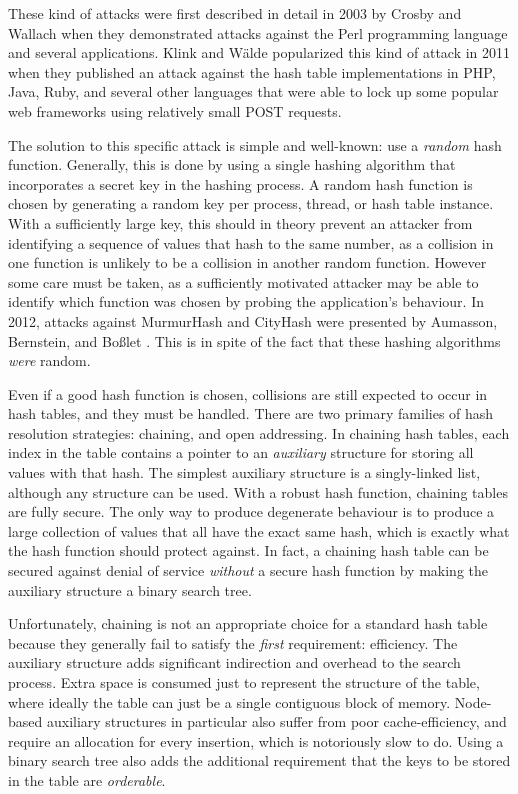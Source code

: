 \documentclass{cccg13}
\begin{document}
These kind of attacks were first described in detail in 2003 by Crosby and
Wallach \cite{perl-dos} when they demonstrated attacks against the Perl
programming language and several applications. Klink and Wälde \cite{web-dos}
popularized this kind of attack in 2011 when they published an attack against
the hash table implementations in PHP, Java, Ruby, and several other languages
that were able to lock up some popular web frameworks using relatively small
POST requests.

The solution to this specific attack is simple and well-known: use a
\emph{random} hash function.  Generally, this is done by using a single
hashing algorithm that incorporates a secret key in the hashing process. A
random hash function is chosen by generating a random key per process, thread,
or hash table instance. With a sufficiently large key, this should in theory
prevent an attacker from identifying a sequence of values that hash to the
same number, as a collision in one function is unlikely to be a collision in
another random function. However some care must be taken, as a sufficiently
motivated attacker may be able to identify which function was chosen by
probing the application's behaviour. In 2012, attacks against MurmurHash and
CityHash were presented by Aumasson, Bernstein, and Boßlet \cite{murmur-dos}.
This is in spite of the fact that these hashing algorithms \emph{were} random.

Even if a good hash function is chosen, collisions are still expected to occur
in hash tables, and they must be handled. There are two primary families of
hash resolution strategies: chaining, and open addressing. In chaining hash
tables, each index in the table contains a pointer to an \emph{auxiliary}
structure for storing all values with that hash. The simplest auxiliary
structure is a singly-linked list, although any structure can be used. With a
robust hash function, chaining tables are fully secure. The only way to
produce degenerate behaviour is to produce a large collection of values that
all have the exact same hash, which is exactly what the hash function should
protect against. In fact, a chaining hash table can be secured against denial
of service \emph{without} a secure hash function by making the auxiliary
structure a binary search tree.

Unfortunately, chaining is not an appropriate choice for a standard hash table
because they generally fail to satisfy the \emph{first} requirement:
efficiency. The auxiliary structure adds significant indirection and overhead
to the search process. Extra space is consumed just to represent the structure
of the table, where ideally the table can just be a single contiguous block of
memory. Node-based auxiliary structures in particular also suffer from poor
cache-efficiency, and require an allocation for every insertion, which is
notoriously slow to do. Using a binary search tree also adds the additional
requirement that the keys to be stored in the table are \emph{orderable}.
\end{document}
